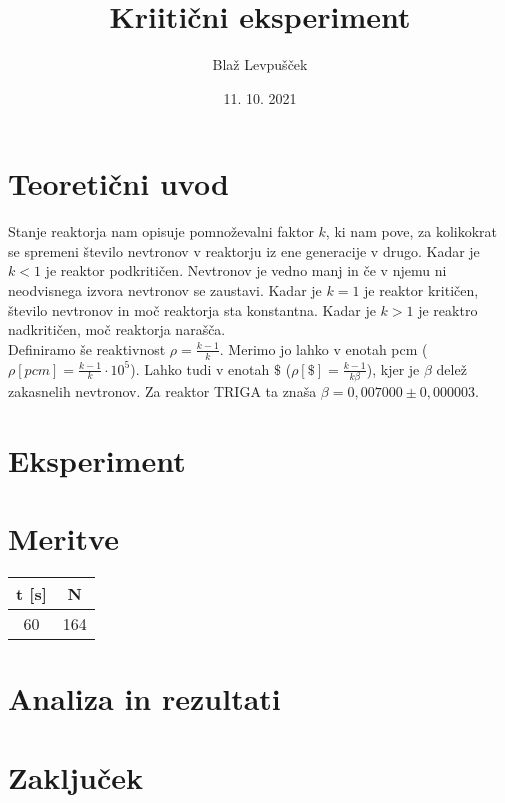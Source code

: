 \documentclass[a4paper,12pt]{article}
\begin{document}
\title{Kriitični eksperiment}
\author{Blaž Levpušček}
\date{11. 10. 2021}
\maketitle



\section{Teoretični uvod}
Stanje reaktorja nam opisuje 
pomnoževalni faktor $k$, ki nam 
pove, za kolikokrat se spremeni
število nevtronov v reaktorju iz 
ene generacije v drugo. 
Kadar je $k < 1$ je reaktor 
podkritičen. Nevtronov je vedno 
manj in če v njemu ni neodvisnega 
izvora nevtronov se zaustavi. 
Kadar je $k = 1$ je reaktor kritičen,
število nevtronov in moč reaktorja sta 
konstantna. 
Kadar je $k > 1$ je reaktro nadkritičen, 
moč reaktorja narašča. 
\\
Definiramo še reaktivnost $\rho = \frac{k - 1}{k}$.
Merimo jo lahko v enotah pcm ($\rho[pcm] = \frac{k - 1}{k}\cdot 10^5$). 
Lahko tudi v enotah $\$$ ($\rho[\$] = \frac{k - 1}{k \beta}$), 
kjer je $\beta$ delež zakasnelih nevtronov.
Za reaktor TRIGA ta znaša $\beta = 0,007000 \pm 0,000003$.


\section{Eksperiment}


\section{Meritve}

\begin{tabular}{|c|c|}

    \hline
   t [s] & N \\
   \hline
   60 & 164\\
  
    \hline
\end{tabular}

\section{Analiza in rezultati}


\section{Zaključek}
\end{document}
